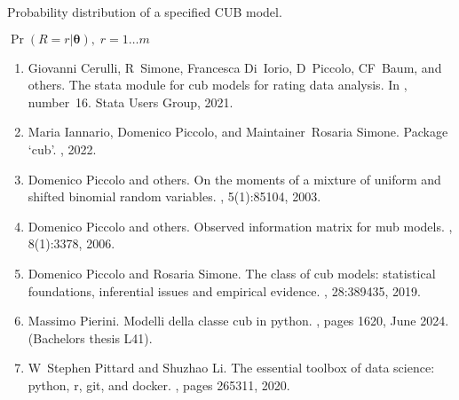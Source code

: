 \documentclass[letterpaper,10pt,english]{sphinxmanual}
\begin{document}
\begin{fulllineitems}
\label{\detokenize{cubmods:cubmods.cub.pmf}}
\pysigstartsignatures
{}
\pysigstopsignatures
\sphinxAtStartPar
Probability distribution of a specified CUB model.

\sphinxAtStartPar
\(\Pr(R = r | \pmb\theta),\; r=1 \ldots m\)
\begin{description}
\begin{enumerate}
%
\setcounter{enumi}{0}
\item {} 
\sphinxAtStartPar
Giovanni Cerulli, R Simone, Francesca Di Iorio, D Piccolo, CF Baum, and others. The stata module for cub models for rating data analysis. In , number 16. Stata Users Group, 2021.

\item {} 
\sphinxAtStartPar
Maria Iannario, Domenico Piccolo, and Maintainer Rosaria Simone. Package ‘cub’. , 2022.

\item {} 
\sphinxAtStartPar
Domenico Piccolo and others. On the moments of a mixture of uniform and shifted binomial random variables. , 5(1):85\textendash{}104, 2003.

\item {} 
\sphinxAtStartPar
Domenico Piccolo and others. Observed information matrix for mub models. , 8(1):33\textendash{}78, 2006.

\item {} 
\sphinxAtStartPar
Domenico Piccolo and Rosaria Simone. The class of cub models: statistical foundations, inferential issues and empirical evidence. , 28:389\textendash{}435, 2019.

\item {} 
\sphinxAtStartPar
Massimo Pierini. Modelli della classe cub in python. , pages 16\textendash{}20, June 2024. (Bachelor\textquotesingle{}s thesis L\sphinxhyphen{}41).

\item {} 
\sphinxAtStartPar
W Stephen Pittard and Shuzhao Li. The essential toolbox of data science: python, r, git, and docker. , pages 265\textendash{}311, 2020.


\end{enumerate}
\end{description}
\end{fulllineitems}
\end{document}
